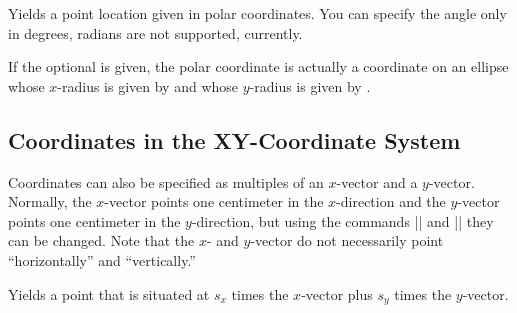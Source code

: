 \begin{command}{\pgfpointpolar{}}
  Yields a point location given in polar coordinates. You can specify
  the angle only in degrees, radians are not supported, currently.

  If the optional  is given, the polar coordinate is
  actually a coordinate on an ellipse whose $x$-radius is given by
   and whose $y$-radius is given by .
\begin{codeexample}[]
\end{codeexample}
\begin{codeexample}[]
\end{codeexample}
\end{command}



\subsection{Coordinates in the XY-Coordinate System}

Coordinates can also be specified as multiples of an $x$-vector and a
$y$-vector. Normally, the $x$-vector points one centimeter in the
$x$-direction and the $y$-vector points one centimeter in the
$y$-direction, but using the commands |\pgfsetxvec| and
|\pgfsetyvec| they can be changed. Note that the $x$- and
$y$-vector do not necessarily point ``horizontally'' and
``vertically.''

\begin{command}{\pgfpointxy{}}
  Yields a point that is situated at $s_x$ times the
  $x$-vector plus $s_y$ times the $y$-vector.
\begin{codeexample}[]
\end{codeexample}
\end{command}


